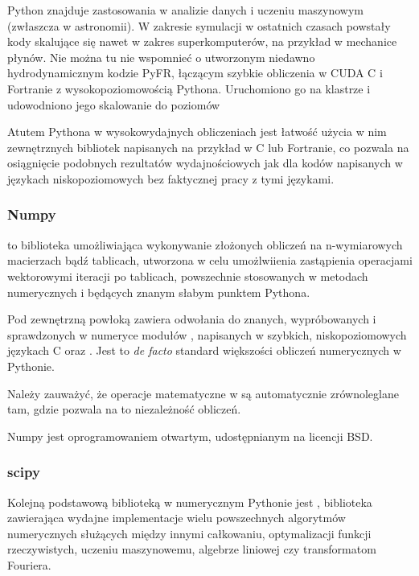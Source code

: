     Python znajduje zastosowania w analizie danych i uczeniu maszynowym
    (zwłaszcza w astronomii\cite{astropy}). W zakresie symulacji w ostatnich czasach powstały
    kody skalujące się nawet w zakres superkomputerów, na przykład w mechanice
    płynów.  Nie można tu nie wspomnieć o utworzonym niedawno hydrodynamicznym kodzie
    PyFR, łączącym szybkie obliczenia w CUDA C i Fortranie z wysokopoziomowością Pythona. Uruchomiono go na klastrze 
    i udowodniono jego skalowanie do poziomów 


    Atutem Pythona w wysokowydajnych obliczeniach jest łatwość użycia w
    nim zewnętrznych bibliotek napisanych na przykład w C lub Fortranie, co
    pozwala na osiągnięcie podobnych rezultatów wydajnościowych jak dla kodów
    napisanych w językach niskopoziomowych bez faktycznej pracy z tymi
    językami.



    \subsubsection{Numpy}
     to biblioteka umożliwiająca wykonywanie złożonych obliczeń na
    n-wymiarowych macierzach bądź tablicach, utworzona w celu umożlwiienia
    zastąpienia operacjami wektorowymi iteracji po tablicach, powszechnie
    stosowanych w metodach numerycznych i będących znanym słabym punktem
    Pythona.


    Pod zewnętrzną powłoką zawiera odwołania do znanych, wypróbowanych i
    sprawdzonych w numeryce modułów ,  napisanych w
    szybkich, niskopoziomowych językach C oraz .  Jest to
    \emph{de facto} standard większości obliczeń numerycznych w Pythonie.

    Należy zauważyć, że operacje matematyczne w  są automatycznie
    zrównoleglane 
     tam, gdzie pozwala na to
    niezależność obliczeń.

    Numpy jest oprogramowaniem otwartym, udostępnianym na licencji BSD.


    \subsubsection{scipy}
    Kolejną podstawową biblioteką w numerycznym Pythonie jest ,
    biblioteka zawierająca wydajne implementacje wielu powszechnych algorytmów
    numerycznych służących między innymi całkowaniu, optymalizacji funkcji rzeczywistych,
    uczeniu maszynowemu, algebrze liniowej czy transformatom Fouriera.  

